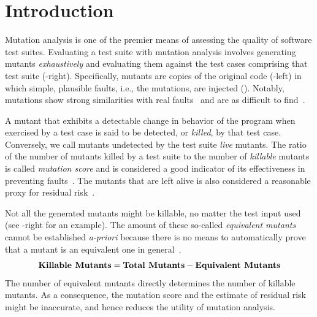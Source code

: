 \documentclass[sigconf,review,anonymous]{acmart}
\begin{document}
\section{Introduction}
Mutation analysis is one of the premier means of assessing the quality of
software test suites\cite{papadakis2019mutation}. %
Evaluating a test suite with mutation analysis involves
generating mutants \emph{exhaustively} and evaluating them against the test cases comprising that test suite
(-right).
%
Specifically, mutants are copies of the original code (-left) in which simple, plausible faults, i.e., the mutations, are injected ().
Notably, mutations show strong similarities with real faults~\cite{daran1996software,just2014are}
and are as difficult to find~\cite{andrews2005is,andrews2006using}.

A mutant that exhibits a detectable change in behavior of the program when
exercised by a test case is said to be detected, or \emph{killed}, by that
test case. Conversely, we call mutants undetected by the test suite \emph{live} mutants.
%
The ratio of the number of mutants killed by a test suite to the 
number of \emph{killable} mutants %
is called \emph{mutation score} and  is considered a good indicator of its
effectiveness in preventing faults~\cite{jia2010an}.
The mutants that are left alive is also considered
a reasonable proxy for residual risk~\cite{horgan1996software}.

Not all the generated mutants might be killable, no matter the test input used~\cite{budd1982two}
(see -right for an example).
%
The amount of these so-called \emph{equivalent mutants} cannot be established 
\emph{a-priori} because there is no means to automatically prove that a mutant
is an equivalent one in general~\cite{budd1982two,rice1953classes}. 
%
$$
\text{\textbf{Killable Mutants}} = \text{\textbf{Total Mutants}} - \text{\textbf{Equivalent Mutants}}
$$
The number of equivalent mutants directly determines the number of killable mutants.
As a consequence, the mutation score and the estimate of residual risk might be inaccurate, and hence reduces the utility of mutation analysis.
\end{document}
